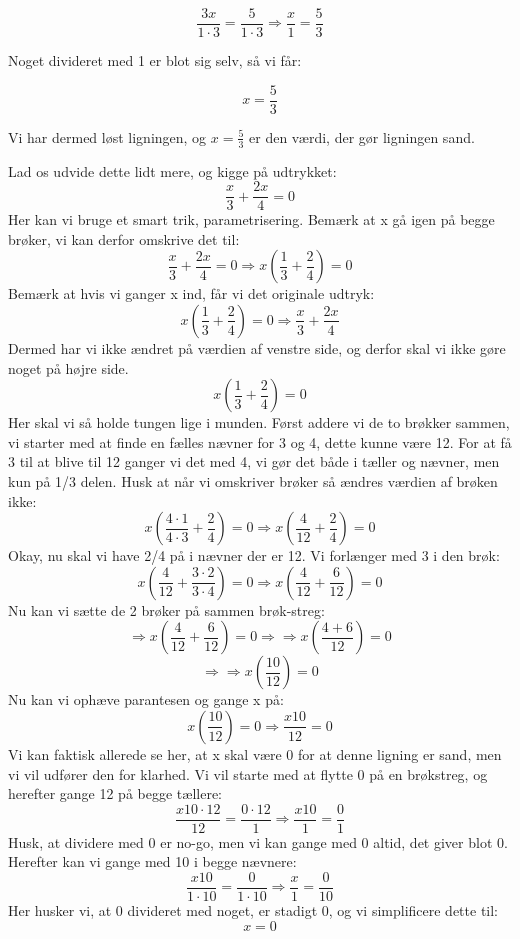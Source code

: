 \[
\frac{3x}{1 \cdot 3} = \frac{5}{1 \cdot 3} \Rightarrow \frac{x}{1} = \frac{5}{3}
\]

Noget divideret med 1 er blot sig selv, så vi får:

\[
x = \frac{5}{3}
\]

Vi har dermed løst ligningen, og $x = \frac{5}{3}$ er den værdi, der gør ligningen sand.


Lad os udvide dette lidt mere, og kigge på udtrykket:
\[
\frac{x}{3} + \frac{2x}{4} = 0
\]
Her kan vi bruge et smart trik, parametrisering. Bemærk at x gå igen på begge brøker, vi kan derfor omskrive det til:
\[
\frac{x}{3} + \frac{2x}{4} = 0 \Rightarrow x\left(\frac{1}{3} + \frac{2}{4}\right) = 0
\]
Bemærk at hvis vi ganger x ind, får vi det originale udtryk:
\[
x\left(\frac{1}{3} + \frac{2}{4}\right) = 0 \Rightarrow \frac{x}{3} + \frac{2x}{4}
\]
Dermed har vi ikke ændret på værdien af venstre side, og derfor skal vi ikke gøre noget på højre side. 
\[
x\left(\frac{1}{3} + \frac{2}{4}\right) = 0 
\]
Her skal vi så holde tungen lige i munden. Først addere vi de to brøkker sammen, vi starter med at finde en fælles nævner for 3 og 4, dette kunne være 12. For at få 3 til at blive til 12 ganger vi det med 4, vi gør det både i tæller og nævner, men kun på 1/3 delen. Husk at når vi omskriver brøker så ændres værdien af brøken ikke:
\[
x\left(\frac{4\cdot1}{4\cdot3} + \frac{2}{4}\right) = 0 \Rightarrow x\left(\frac{4}{12} + \frac{2}{4}\right) = 0 
\]
Okay, nu skal vi have 2/4 på i nævner der er 12. Vi forlænger med 3 i den brøk:
\[
x\left(\frac{4}{12} + \frac{3\cdot2}{3\cdot4}\right) = 0 \Rightarrow x\left(\frac{4}{12} + \frac{6}{12}\right) = 0 
\]
Nu kan vi sætte de 2 brøker på sammen brøk-streg:
\[
\Rightarrow x\left(\frac{4}{12} + \frac{6}{12}\right) = 0 \Rightarrow \Rightarrow x\left(\frac{4+6}{12}\right) = 0 
\]
\[
\Rightarrow \Rightarrow x\left(\frac{10}{12}\right) = 0 
\]
Nu kan vi ophæve parantesen og gange x på:
\[
x\left(\frac{10}{12}\right) = 0 \Rightarrow \frac{x10}{12} = 0
\]
Vi kan faktisk allerede se her, at x skal være 0 for at denne ligning er sand, men vi vil udfører den for klarhed. Vi vil starte med at flytte 0 på en brøkstreg, og herefter gange 12 på begge tællere:
\[
\frac{x10\cdot12}{12} = \frac{0\cdot12}{1} \Rightarrow \frac{x10}{1} = \frac{0}{1} 
\]
Husk, at dividere med 0 er no-go, men vi kan gange med 0 altid, det giver blot 0.
Herefter kan vi gange med 10 i begge nævnere:
\[
\frac{x10}{1\cdot10} = \frac{0}{1\cdot10} \Rightarrow \frac{x}{1} = \frac{0}{10} 
\]
Her husker vi, at 0 divideret med noget, er stadigt 0, og vi simplificere dette til:
\[
x = 0
\]

